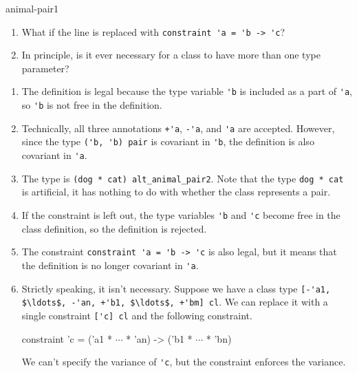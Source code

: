 \begin{exercise}{animal-pair1}
\begin{enumerate}
\item

What if the line is replaced with \hbox{\lstinline$constraint 'a = 'b -> 'c$}?

\item

In principle, is it ever necessary for a class to have more than one
type parameter?
\end{enumerate}

\begin{answer}\ifanswers
\begin{enumerate}
\item 

The definition is legal because the type variable \hbox{\lstinline$'b$} is
included as a part of \hbox{\lstinline$'a$}, so \hbox{\lstinline$'b$} is not free in
the definition.

\item

Technically, all three annotations \hbox{\lstinline$+'a$}, \hbox{\lstinline$-'a$},
and \hbox{\lstinline$'a$} are accepted.  However, since the
type \hbox{\lstinline$('b, 'b) pair$} is covariant in \hbox{\lstinline$'b$}, the
definition is also covariant in \hbox{\lstinline$'a$}.

\item

The type is \hbox{\lstinline$(dog * cat) alt_animal_pair2$}.  Note that the
type \hbox{\lstinline$dog * cat$} is artificial, it has nothing to do
with whether the class represents a pair.

\item

If the constraint is left out, the type variables \hbox{\lstinline$'b$}
and \hbox{\lstinline$'c$} become free in the class definition, so the
definition is rejected.

\item

The constraint \hbox{\lstinline$constraint 'a = 'b -> 'c$} is also legal, but
it means that the definition is no longer covariant in \hbox{\lstinline$'a$}.

\item

Strictly speaking, it isn't necessary.  Suppose we have a class type
\hbox{\lstinline/[-'a1, $\ldots$, -'an, +'b1, $\ldots$, +'bm] cl/}.
We can replace it with a single constraint \hbox{\lstinline/['c] cl/}
and the following constraint.

\begin{ocaml}
constraint 'c = ('a1 * $\cdots$ * 'an) -> ('b1 * $\cdots$ * 'bn)
\end{ocaml}
%
We can't specify the variance of \hbox{\lstinline$'c$}, but the constraint
enforces the variance.
\end{enumerate}
\fi\end{answer}
\end{exercise}

